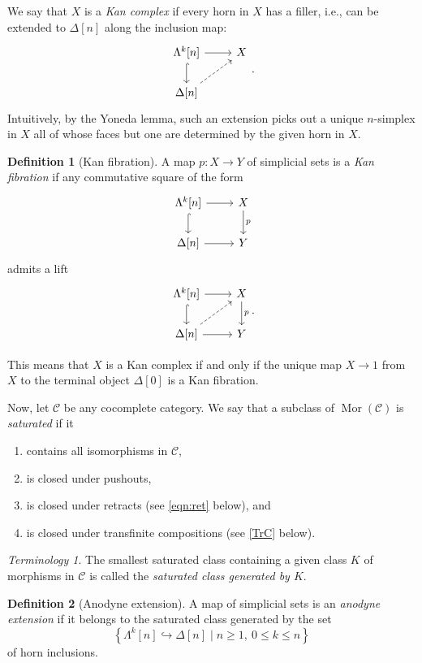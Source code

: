 \documentclass[10pt,letterpaper,cm]{nupset}
\theoremstyle{definition}
\newtheorem{definition}{Definition}[subsection]
\theoremstyle{theorem}
\theoremstyle{remark}
\newtheorem*{term}{Terminology}
\DeclareMathOperator{\mor}{Mor}
\newcommand{\0}{\mathbf{0}}
\newcommand{\1}{\mathbf{1}}
\newcommand{\2}{\mathbf{2}}
\renewcommand{\c}{\mathscr{C}}
\newcommand{\be}{\begin{enumerate}}
\newcommand{\ee}{\end{enumerate}}
\begin{document}
We say that $X$ is a \textit{Kan complex} if every horn in $X$ has a filler, i.e., can be extended to $\Delta[n]$ along the inclusion map:
\[
\begin{tikzcd}
{\Lambda^k[n]} \arrow[d, hook] \arrow[r] & X \\
\Delta[n] \arrow[ru, dashed]              &  
\end{tikzcd}
.\]
Intuitively, by the Yoneda lemma, such an extension picks out a unique $n$-simplex in $X$ all of whose faces but one are determined by the given horn in $X$. 


\begin{definition}[Kan fibration]\label{KF}
A map $p: X\to Y$ of simplicial sets is a \textit{Kan fibration} if any commutative square of the form
\[
\begin{tikzcd}
{\Lambda^k[n]} \arrow[d, hook] \arrow[r] & X \arrow[d, "p"] \\
\Delta[n] \arrow[r]                       & Y               
\end{tikzcd}
\] admits a lift
\[
\begin{tikzcd}
{\Lambda^k[n]} \arrow[d, hook] \arrow[r] & X \arrow[d, "p"] \\
\Delta[n] \arrow[r] \arrow[ru, dashed]    & Y               
\end{tikzcd}.
\]
\end{definition}

This means that $X$ is a Kan complex if and only if the unique map $X \to 1$ from $X$ to the terminal object $\Delta[0]$ is a Kan fibration.

\medskip

Now, let $\c$ be any cocomplete category. We say that a subclass of $\mor(\c)$ is \textit{saturated} if it
\be[label=(\roman*)]
\item contains all isomorphisms in $\c$,
\item is closed under pushouts,
\item is closed under retracts (see \eqref{eqn:ret} below), and
\item is closed under transfinite compositions (see \cref{TrC} below).
\ee

\begin{term}
The smallest saturated class containing a given class $K$ of morphisms in $\c$ is called the \textit{saturated class generated by $K$}.
\end{term}

\begin{definition}[Anodyne extension]\label{anodyne}
A map of simplicial sets is an \textit{anodyne extension} if it belongs to the saturated class  generated by the set 
\[
\left\{\Lambda^k[n] \hookrightarrow \Delta[n] \mid n\geq 1, \ 0\leq k \leq n\right\}
\] of horn inclusions.
\end{definition}
\end{document}
